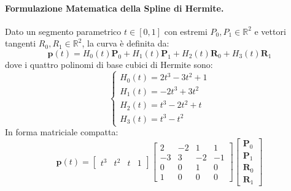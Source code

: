 \documentclass[11pt,a4paper]{article}
\begin{document}
\paragraph{Formulazione Matematica della Spline di Hermite.}
Dato un segmento parametrico $t \in [0, 1]$ con estremi $P_0, P_1 \in \mathbb{R}^2$ e vettori tangenti $R_0, R_1 \in \mathbb{R}^2$, la curva è definita da:
\begin{equation}
\mathbf{p}(t) = H_0(t)\mathbf{P}_0 + H_1(t)\mathbf{P}_1 + H_2(t)\mathbf{R}_0 + H_3(t)\mathbf{R}_1
\end{equation}
dove i quattro polinomi di base cubici di Hermite sono:
\begin{equation}
\begin{cases}
H_0(t) = 2t^3 - 3t^2 + 1 \\
H_1(t) = -2t^3 + 3t^2 \\
H_2(t) = t^3 - 2t^2 + t \\
H_3(t) = t^3 - t^2
\end{cases}
\end{equation}
In forma matriciale compatta:
\begin{equation}
\mathbf{p}(t) = \begin{bmatrix} t^3 & t^2 & t & 1 \end{bmatrix}
\begin{bmatrix}
2 & -2 & 1 & 1 \\
-3 & 3 & -2 & -1 \\
0 & 0 & 1 & 0 \\
1 & 0 & 0 & 0
\end{bmatrix}
\begin{bmatrix}
\mathbf{P}_0 \\ \mathbf{P}_1 \\ \mathbf{R}_0 \\ \mathbf{R}_1
\end{bmatrix}
\end{equation}
\end{document}
